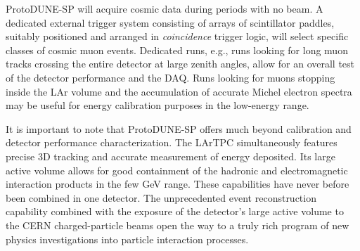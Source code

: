 ProtoDUNE-SP will acquire cosmic data during periods with no beam. A dedicated external trigger system consisting of arrays of scintillator paddles, suitably positioned and arranged in \textit{coincidence} trigger logic, 
will select specific classes of cosmic muon events. Dedicated runs, e.g., runs looking for long muon tracks crossing the entire detector at large zenith angles, allow for an overall test of the detector performance and the DAQ. Runs looking for muons stopping inside the LAr volume and the accumulation of accurate Michel electron spectra may be useful for energy calibration purposes in the low-energy range.


It is important to note that ProtoDUNE-SP offers much beyond calibration  and detector performance characterization.  The LArTPC simultaneously features precise 3D tracking and accurate measurement of energy deposited. Its large active volume allows for good containment of the hadronic and electromagnetic interaction products in the few GeV range. These capabilities have never before been combined in one detector.  The unprecedented event reconstruction capability combined with the exposure of the detector's large active volume to the CERN charged-particle beams open the way to a truly rich program of new physics investigations into particle interaction processes. 


